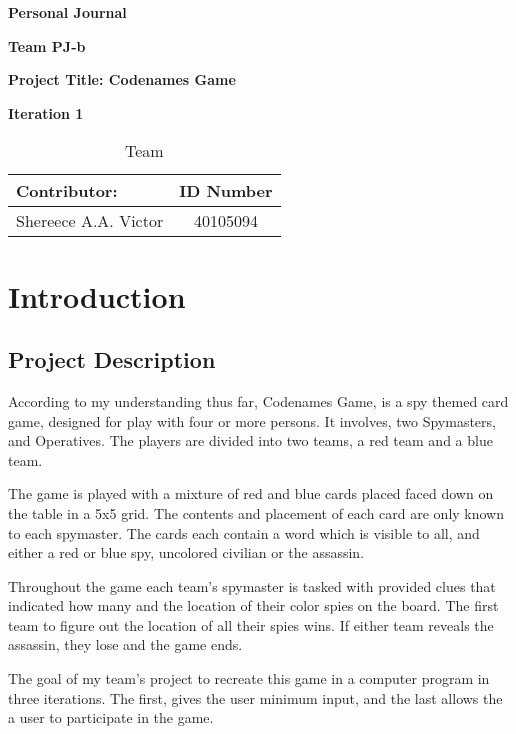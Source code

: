 \documentclass[12pt]{article}
\begin{document}
\vspace*{0.5in}
\centerline{\bf\Large Personal Journal}
\vspace*{0.5in}
\centerline{\bf\Large Team PJ-b}
\vspace*{0.5in}
\centerline{\bf\Large Project Title: Codenames Game }
\vspace*{0.25in}
\centerline{\bf\Large Iteration 1}


\vspace*{2in}
\begin{table}[htbp]
\caption{Team}
\begin{center}
\begin{tabular}{|l | c|}
\hline
Contributor: & ID Number \\
\hline\hline
Shereece A.A. Victor  & 40105094  \\
\hline
\end{tabular}
\end{center}
\end{table}

\clearpage
\section{Introduction}

\subsection{Project Description}
According to my understanding thus far, Codenames Game, is a spy themed card game, designed for play with four or more persons. It involves, two Spymasters, and Operatives. The players are divided into two teams, a red team and a blue team. 

The game is played with a mixture of red and blue cards placed faced down on the table in a 5x5 grid. The contents and placement of each card are only known to each spymaster. The cards each contain a word which is visible to all, and either a red or blue spy, uncolored civilian or the assassin. 

Throughout the game each team’s spymaster is tasked with provided clues that indicated how many and the location of their color spies on the board. The first team to figure out the location of all their spies wins. If either team reveals the assassin, they lose and the game ends. 

The goal of my team’s project to recreate this game in a computer program in three iterations. The first, gives the user minimum input, and the last allows the a user to participate in the game. 
\end{document}
